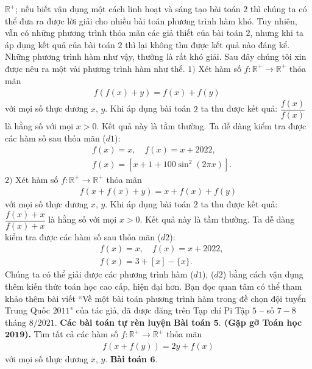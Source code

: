 \begin{multicols}{2}
	$\mathbb R^+$; nếu biết vận dụng một cách linh hoạt và sáng tạo    
	bài toán $2$ thì chúng ta có thể đưa ra được lời giải cho nhiều bài toán phương trình hàm khó. Tuy nhiên, vẫn có những phương trình thỏa mãn các giả thiết của bài toán $2$, nhưng khi ta áp dụng kết quả của bài toán $2$ thì lại không thu được kết quả nào đáng kể. Những phương trình hàm như vậy, thường là rất khó giải. Sau đây chúng tôi xin được nêu ra một vài phương trình hàm như thế.
	\vskip 0.1cm
	$1)$ Xét hàm số $f: \mathbb R^+ \to \mathbb R^+$ thỏa mãn 
	\begin{align*}
		f(f(x)+y) = f(x)+f(y)\,\, \tag{$d1$}
	\end{align*}
	với mọi số thực dương $x$, $y$.
	Khi áp dụng 
	bài toán $2$ ta thu được kết quả: $\dfrac{{f(x)}}{{f(x)}}$ là hằng số với mọi $x>0$. Kết quả này  là tầm thường. Ta dễ dàng kiểm tra được các hàm số sau thỏa mãn ($d1$):
	\begin{align*}
		&f(x) = x,\quad f(x) =x+2022,\\
		&f(x) = \left[ {x + 1 + 100{{\sin }^2}(2\pi x)} \right].
	\end{align*}
	$2)$  Xét hàm số $f: \mathbb R^+ \to \mathbb R^+$ thỏa mãn 
	\begin{align*}
		f(x+f(x)+y)=x+f(x)+f(y)\tag{$d2$}
	\end{align*}
	với mọi số thực dương $x$, $y$.
	Khi áp dụng 
	bài toán $2$ ta thu được kết quả: $\dfrac{{f(x)+x}}{{f(x)+x}}$ là hằng số với mọi $x>0$. Kết quả này  là tầm thường. 
	Ta dễ dàng kiểm tra được các hàm số sau thỏa mãn ($d2$):
	\begin{align*}
		&f(x) = x,\quad 
		f(x) =x+2022,\\
		&f(x) = 3 + \left[ x \right] - \{ x\}.
	\end{align*}
	Chúng ta có thể giải được các phương trình hàm ($d1$), ($d2$) bằng cách vận dụng thêm 
	kiến thức toán học cao cấp, hiện đại  hơn. Bạn đọc quan tâm có thể tham khảo thêm bài viết ``Về một bài toán phương trình hàm trong đề chọn đội tuyển Trung Quốc $2011$" của tác giả, đã được đăng trên 
	Tạp chí Pi Tập $5$ -- số $7-8$ tháng $8/2021$.
	\vskip 0.1cm
	\textbf{\color{hoccungpi}Các bài toán tự rèn luyện}
	\vskip 0.1cm
	\textbf{\color{hoccungpi}Bài toán $\pmb{5.}$ (Gặp gỡ Toán học $\pmb{2019}$).}
	Tìm tất cả các hàm số $f: \mathbb{R}^{+} \rightarrow \mathbb{R}^{+}$ thỏa mãn
	\begin{align*}
		f(x+f(y))=2 y+f(x)
	\end{align*}
	với mọi số thực dương $x$, $y$.
	\vskip 0.1cm
	\textbf{\color{hoccungpi}Bài toán $\pmb{6.}$}

\end{multicols}
